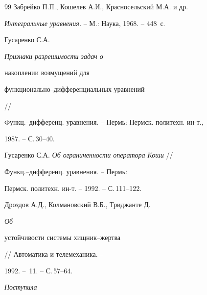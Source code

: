 \begin{thebibliography}{99}
Забрейко П.П., Кошелев А.И., Красносельский М.А. и др.


{\em Интегральные уравнения.} -- М.: Наука, 1968. -- 448~с.




Гусаренко С.А. {\em Признаки разрешимости задач о


накоплении возмущений для


функ\-ци\-о\-наль\-но--дифференциальных уравнений} //


Функц.--дифференц. уравнения. -- Пермь: Пермск. политехн. ин-т.,


1987. -- С.\,30--40.




Гусаренко С.А. {\em Об ограниченности оператора Коши} //


Функц.--дифференц. уравнения. -- Пермь:


Пермск. политехн. ин-т. -- 1992. -- С.\,111--122.




Дроздов А.Д., Колмановский В.Б., Триджанте Д. {\em Об


устойчивости системы хищник--жертва} // Автоматика и телемеханика. --


1992. -- \No\,11. -- С.\,57--64.





\end{thebibliography}





\vskip 2cm





 {\it Поступила}




\smallskip







\label{end}





